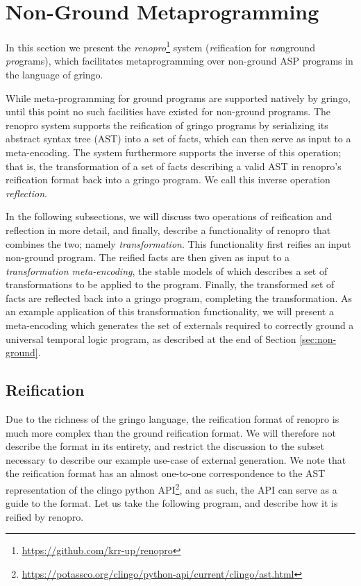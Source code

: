 \section{Non-Ground Metaprogramming}\label{sec:renopro}

In this section we present the
\emph{renopro}\footnote{\url{https://github.com/krr-up/renopro}}
system (\emph{re}ification for \emph{no}nground \emph{pro}grams), which
facilitates metaprogramming over non-ground ASP programs in the
language of gringo.

While meta-programming for ground programs are supported natively by
gringo, until this point no such facilities have existed for
non-ground programs. The renopro system supports the reification of
gringo programs by serializing its abstract syntax tree (AST) into a
set of facts, which can then serve as input to a meta-encoding. The
system furthermore supports the inverse of this operation; that is,
the transformation of a set of facts describing a valid AST in
renopro's reification format back into a gringo program. We call this
inverse operation \emph{reflection}.

In the following subsections, we will discuss two operations of
reification and reflection in more detail, and finally, describe a
functionality of renopro that combines the two; namely
\emph{transformation}. This functionality first reifies an input
non-ground program. The reified facts are then given as input to a
\emph{transformation meta-encoding}, the stable models of which
describes a set of transformations to be applied to the
program. Finally, the transformed set of facts are reflected back into
a gringo program, completing the transformation. As an example
application of this transformation functionality, we will present a
meta-encoding which generates the set of externals required to
correctly ground a universal temporal logic program, as described at
the end of Section \ref{sec:non-ground}.

\subsection{Reification}

Due to the richness of the gringo language, the reification format of
renopro is much more complex than the ground reification format. We
will therefore not describe the format in its entirety, and restrict
the discussion to the subset necessary to describe our example
use-case of external generation. We note that the reification format
has an almost one-to-one correspondence to the AST representation of
the clingo python
API\footnote{\url{https://potassco.org/clingo/python-api/current/clingo/ast.html}},
and as such, the API can serve as a guide to the format. Let us take
the following program, and describe how it is reified by renopro.

